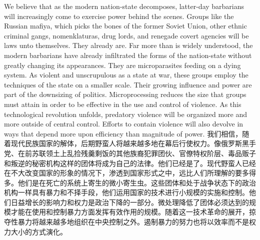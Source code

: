 \begin{paracol}{2}[]
We believe that as the modern nation-state decomposes, latter-day barbarians will increasingly come to exercise power behind the scenes. Groups like the Russian mafiya, which picks the bones of the former Soviet Union, other ethnic criminal gangs, nomenklaturas, drug lords, and renegade covert agencies will be laws unto themselves. They already are. Far more than is widely understood, the modern barbarians have already infiltrated the forms of the nation-state without greatly changing its appearances. They are microparasites feeding on a dying system. As violent and unscrupulous as a state at war, these groups employ the techniques of the state on a smaller scale. Their growing influence and power are part of the downsizing of politics. Microprocessing reduces the size that groups must attain in order to be effective in the use and control of violence. As this technological revolution unfolds, predatory violence will be organized more and more outside of central control. Efforts to contain violence will also devolve in ways that depend more upon efficiency than magnitude of power.
\switchcolumn
我们相信，随着现代民族国家的解体，后期野蛮人将越来越多地在幕后行使权力。像俄罗斯黑手党、在前苏联领土上乱捡残羹剩饭的其他族裔犯罪团伙、官僚特权阶层、毒品贩子和叛逆的秘密机构这样的团体将成为自己的法律。他们已经是了。现代野蛮人已经在不大改变国家的形象的情况下，渗透到国家形式之中，远比人们所理解的要多得多。他们是在死亡的系统上寄生的微小寄生虫。这些团体和处于战争状态下的政治机构一样具有暴力和不择手段，他们运用国家的技术进行小规模的实施和控制。他们日益增长的影响力和权力是政治下降的一部分。微处理降低了团体必须达到的规模才能在使用和控制暴力方面发挥有效作用的规模。随着这一技术革命的展开，掠夺性暴力将越来越多地组织在中央控制之外。遏制暴力的努力也将以效率而不是权力大小的方式演化。
\end{paracol}

